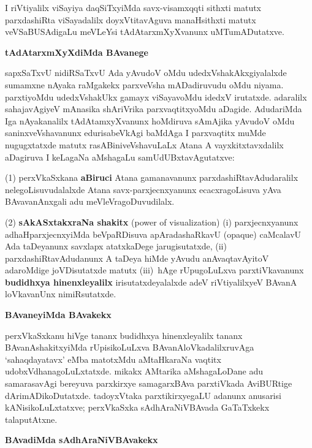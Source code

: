 I riVtiyalilx viSayiya daqSiTxyiMda savx-visamxqqti sithxti matutx parxdashiRta viSayadalilx doyxVtitavAguva manaHsithxti matutx veVSaBUSAdigaLu meVLeYsi tAdAtarxmXyXvanunx uMTumADutatxve.

\newpage

\begin{center}
{\Large\bf tAdAtarxmXyXdiMda BAvanege}
\end{center}

sapxSaTxvU nidiRSaTxvU Ada yAvudoV oMdu udedxVshakAkxgiyalalxde sumamxne nAyaka raMgakekx parxveVsha mADadiruvudu oMdu niyama. parxtiyoMdu udedxVshakUkx gamayx viSayavoMdu idedxV irutatxde. adaralilx sahajavAgiyeV mAnasika shAriVrika parxvaqtitxyoMdu aDagide. AdudariMda Iga nAyakanalilx tAdAtamxyXvanunx hoMdiruva sAmAjika yAvudoV oMdu saninxveVshavanunx edurisabeVkAgi baMdAga I parxvaqtitx muMde nugugxtatxde matutx rasABiniveVshavuLaLx Atana A vayxkitxtavxdalilx aDagiruva I keLagaNa aMshagaLu samUdUBxtavAgutatxve:

\smallskip
(1) perxVkaSxkana {\bf aBiruci} Atana gamanavanunx parxdashiRtavAdudaralilx nelegoLisuvu\-dalalxde Atana savx-parxjecnxyanunx ecacxragoLisuva yAva BAvavanAnxgali adu meVleVragoDuvudilalx.

\smallskip
(2) {\bf sAkASxtakxraNa shakitx} {\rm(power of visualization)} {\rm(i)} parxjecnxyanunx adhaHparxjecnxyiMda beVpaRDisuva apAradashaRkavU {\rm(opaque)} caMcalavU Ada taDeyanunx savxlapx atatxkaDege jarugisutatxde, {\rm(ii)} parxdashiRtavAdudanunx A taDeya hiMde yAvudu anAvaqtavAyitoV adaroMdige joVDisutatxde matutx \hbox{{\rm(iii)} hAge} rUpugoLuLxva parxtiVkavanunx {\bf budidhxya hinenxleyalilx} irisutatxdeyalalxde adeV riVtiyalilxyeV BAvanA loVkavanUnx nimiRsutatxde.

\begin{center}
{\Large\bf BAvaneyiMda BAvakekx}
\end{center}

perxVkaSxkanu hiVge tananx budidhxya hinenxleyalilx tananx BAvanAshakitxyiMda rUpisi\-koLuLxva BAvanAloVkadalilxruvAga `sahaqdayatavx' eMba matotxMdu aMtaHkaraNa vaqtitx udobxV\-dhanagoLuLxtatxde. mikakx AMtarika aMshagaLoDane adu samarasavAgi bereyuva parxkirxye samagarxBAva parxtiVkada AviBURtige dArimADikoDutatxde. tadoyxVtaka parxtikirxyegaLU adanunx anusarisi kANisikoLuLxtatxve; perxVkaSxka sAdhAraNiVBAvada GaTaTxkekx talaputAtxne.


\begin{center}
{\Large\bf BAvadiMda sAdhAraNiVBAvakekx}
\end{center}

